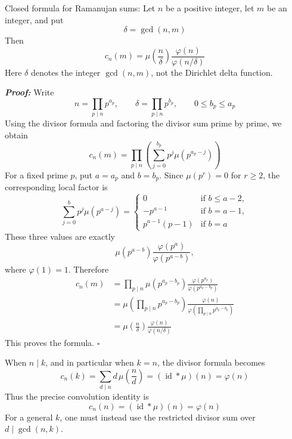 \documentclass[a4paper,11pt,abstracton]{scrartcl}
\theoremstyle{dotlessP}
\theoremstyle{dotlessS}
\theoremstyle{remark}
\theoremstyle{definition}
\begin{document}
\begin{mainbox}{Closed formula for Ramanujan sums:}
Let $n$ be a positive integer, let $m$ be an integer, and put
\[
    \delta=\gcd(n,m)
\]
Then
\[
    c_n(m)=
      \mu\!\left(\frac n\delta\right)
      \frac{\varphi(n)}{\varphi(n/\delta)}
\]
Here $\delta$ denotes the integer $\gcd(n,m)$, not the Dirichlet delta
function.
\end{mainbox}

\begin{claim_box}
\textbf{\textit{Proof:}}
Write
\[
    n=\prod_{p\mid n}p^{a_p},
    \qquad
    \delta=\prod_{p\mid n}p^{b_p},
    \qquad 0\leq b_p\leq a_p
\]
Using the divisor formula and factoring the divisor sum prime by prime,
we obtain
\[
    c_n(m)
      =\prod_{p\mid n}
        \left(\sum_{j=0}^{b_p}
          p^j\mu\!\left(p^{a_p-j}\right)\right)
\]
For a fixed prime $p$, put $a=a_p$ and $b=b_p$. Since
$\mu(p^r)=0$ for $r\geq2$, the corresponding local factor is
\[
    \sum_{j=0}^{b}p^j\mu(p^{a-j})
      =
      \begin{cases}
          0 & \text{if $b\leq a-2$},\\
          -p^{a-1} & \text{if $b=a-1$},\\
          p^{a-1}(p-1) & \text{if $b=a$}
      \end{cases}
\]
These three values are exactly
\[
    \mu(p^{a-b})
      \frac{\varphi(p^a)}{\varphi(p^{a-b})},
\]
where $\varphi(1)=1$. Therefore
\begin{align*}
    c_n(m)
      &=\prod_{p\mid n}
        \mu(p^{a_p-b_p})
        \frac{\varphi(p^{a_p})}
             {\varphi(p^{a_p-b_p})}\\
      &=\mu\!\left(\prod_{p\mid n}p^{a_p-b_p}\right)
        \frac{\varphi(n)}
             {\varphi\!\left(\prod_{p\mid n}p^{a_p-b_p}\right)}\\
      &=\mu\!\left(\frac n\delta\right)
        \frac{\varphi(n)}{\varphi(n/\delta)}
\end{align*}
This proves the formula.
\hfill$\square$
\end{claim_box}

\begin{remark_box}
When $n\mid k$, and in particular when $k=n$, the divisor formula
becomes
\[
    c_n(k)=\sum_{d\mid n}d\,\mu\!\left(\frac nd\right)
      =(\operatorname{id}*\mu)(n)=\varphi(n)
\]
Thus the precise convolution identity is
\[
   c_n(n)=(\operatorname{id}*\mu)(n)=\varphi(n)
\]
For a general $k$, one must instead use the restricted divisor sum
over $d\mid\gcd(n,k)$.
\end{remark_box}
\end{document}
